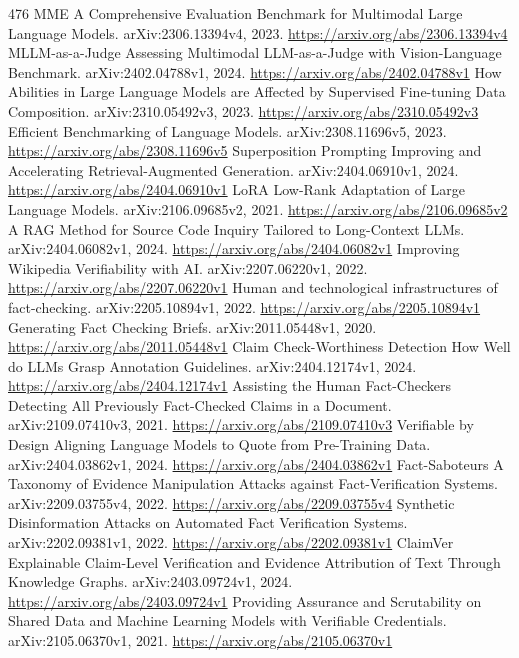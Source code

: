 \documentclass[11pt]{article}
\begin{document}
\begin{thebibliography}{476}
 MME A Comprehensive Evaluation Benchmark for Multimodal Large Language Models. arXiv:2306.13394v4, 2023. \url{https://arxiv.org/abs/2306.13394v4}
 MLLM-as-a-Judge Assessing Multimodal LLM-as-a-Judge with Vision-Language Benchmark. arXiv:2402.04788v1, 2024. \url{https://arxiv.org/abs/2402.04788v1}
 How Abilities in Large Language Models are Affected by Supervised Fine-tuning Data Composition. arXiv:2310.05492v3, 2023. \url{https://arxiv.org/abs/2310.05492v3}
 Efficient Benchmarking of Language Models. arXiv:2308.11696v5, 2023. \url{https://arxiv.org/abs/2308.11696v5}
 Superposition Prompting Improving and Accelerating Retrieval-Augmented Generation. arXiv:2404.06910v1, 2024. \url{https://arxiv.org/abs/2404.06910v1}
 LoRA Low-Rank Adaptation of Large Language Models. arXiv:2106.09685v2, 2021. \url{https://arxiv.org/abs/2106.09685v2}
 A RAG Method for Source Code Inquiry Tailored to Long-Context LLMs. arXiv:2404.06082v1, 2024. \url{https://arxiv.org/abs/2404.06082v1}
 Improving Wikipedia Verifiability with AI. arXiv:2207.06220v1, 2022. \url{https://arxiv.org/abs/2207.06220v1}
 Human and technological infrastructures of fact-checking. arXiv:2205.10894v1, 2022. \url{https://arxiv.org/abs/2205.10894v1}
 Generating Fact Checking Briefs. arXiv:2011.05448v1, 2020. \url{https://arxiv.org/abs/2011.05448v1}
 Claim Check-Worthiness Detection How Well do LLMs Grasp Annotation Guidelines. arXiv:2404.12174v1, 2024. \url{https://arxiv.org/abs/2404.12174v1}
 Assisting the Human Fact-Checkers Detecting All Previously Fact-Checked Claims in a Document. arXiv:2109.07410v3, 2021. \url{https://arxiv.org/abs/2109.07410v3}
 Verifiable by Design Aligning Language Models to Quote from Pre-Training Data. arXiv:2404.03862v1, 2024. \url{https://arxiv.org/abs/2404.03862v1}
 Fact-Saboteurs A Taxonomy of Evidence Manipulation Attacks against Fact-Verification Systems. arXiv:2209.03755v4, 2022. \url{https://arxiv.org/abs/2209.03755v4}
 Synthetic Disinformation Attacks on Automated Fact Verification Systems. arXiv:2202.09381v1, 2022. \url{https://arxiv.org/abs/2202.09381v1}
 ClaimVer Explainable Claim-Level Verification and Evidence Attribution of Text Through Knowledge Graphs. arXiv:2403.09724v1, 2024. \url{https://arxiv.org/abs/2403.09724v1}
 Providing Assurance and Scrutability on Shared Data and Machine Learning Models with Verifiable Credentials. arXiv:2105.06370v1, 2021. \url{https://arxiv.org/abs/2105.06370v1}

\end{thebibliography}
\end{document}
